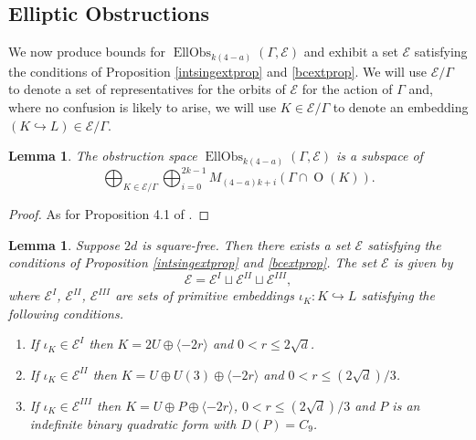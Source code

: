 \documentclass[12pt, a4paper]{article}
\newtheorem{lemma}[thm]{Lemma}
\newcommand{\la}{\langle}
\newcommand{\ra}{\rangle}
\newcommand{\ec}{\mathcal{E}}
\newcommand{\opn}{\operatorname}
\newcommand{\op}{\oplus}
\begin{document}
\subsection{Elliptic Obstructions}\label{ellobssec}
We now produce bounds for $\opn{EllObs}_{k(4-a)}(\Gamma, \ec)$ and exhibit a set $\ec$ satisfying the conditions of Proposition \ref{intsingextprop} and \ref{bcextprop}.
We will use $\ec/\Gamma$ to denote a set of representatives for the orbits of $\ec$ for the action of $\Gamma$ and, where no confusion is likely to arise, we will use $K \in \ec / \Gamma$ to denote an embedding $(K \hookrightarrow L) \in \ec/\Gamma$.
\begin{lemma}\label{ellobsprop}
  The obstruction space $\opn{EllObs}_{k(4-a)}(\Gamma, \ec)$ is a subspace of
\[
  \bigoplus_{K \in \ec/\Gamma} \bigoplus_{i=0}^{2k-1} M_{(4-a)k + i}(\Gamma \cap \opn{O}(K)).
  \]
\end{lemma}
\begin{proof}
  As for Proposition 4.1 of \cite{HMvol}.
\end{proof}
\begin{lemma}\label{eclem}
  Suppose $2d$ is square-free.
  Then there exists a set $\ec$ satisfying the conditions of Proposition \ref{intsingextprop} and \ref{bcextprop}.
  The set $\ec$ is given by
  \[
  \ec =
  \ec^{I}  \sqcup
  \ec^{II} \sqcup
  \ec^{III},
  \]
  where $\ec^{I}$, $\ec^{II}$, $\ec^{III}$ are sets of primitive embeddings $\iota_K: K \hookrightarrow L$ satisfying the following conditions.
  \begin{enumerate}
  \item If $\iota_K \in \ec^{I}$ then $ K=2U \op \la -2r \ra$ and $0<r\leq 2 \sqrt{d}$.
  \item If $\iota_K \in \ec^{II}$ then $K=U \op U(3) \op \la -2r \ra$ and $0<r\leq (2 \sqrt{d})/3$.
  \item If $\iota_K \in \ec^{III}$ then  $K=U \op P \op \la -2r \ra$, $0<r\leq (2 \sqrt{d})/3$ and $P$ is an indefinite binary quadratic form with $D(P) = C_9$.
  \end{enumerate}
\end{lemma}
\end{document}
